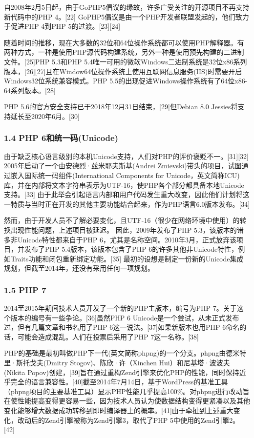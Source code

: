 自2008年2月5日起，由于GoPHP5倡议的缘故，许多广受关注的开源项目不再支持新代码中的PHP 4。[22] GoPHP5倡议是由一个PHP开发者联盟发起的，他们致力于促进PHP 4到PHP 5的过渡。[23][24]

随着时间的推移，现在大多数的32位和64位操作系统都可以使用PHP解释器。有两种方式，一种是使用PHP源代码构建系统，另外一种是使用预先构建的二进制文件。[25]PHP 5.3和PHP 5.4唯一可用的微软Windows二进制系统是32位x86系列版本，[26][27]且在Window64位操作系统上使用互联网信息服务(IIS)时需要开启Windows32位系统兼容模式。PHP 5.5的出现促进Windows操作系统有了64位x86-64系列版本。[28]

PHP 5.6的官方安全支持已于2018年12月31日结束，[29]但Debian 8.0 Jessies将支持延长至2020年6月。[30]
\subsubsection{1.4 PHP 6和统一码(Unicode)}
由于缺乏核心语言级别的本机Unicode支持，人们对PHP的评价褒贬不一。[31][32] 2005年启动了一个由安德烈·兹米耶夫斯基(Andrei Zmievski)带头的项目，试图通过嵌入国际统一码组件(International Components for Unicode，英文简称ICU)库，并在内部将文本字符串表示为UTF-16，使PHP各个部分都具备本地Unicode支持。[33] 由于此举会引起语言内部和用户代码发生重大改变，因此他们计划将这一特质与当时正在开发的其他主要功能结合起来，作为PHP语言6.0版本发布。[34]

然而，由于开发人员不了解必要变化，且UTF-16（很少在网络环境中使用）的转换出现性能问题，上述项目被延迟。 因此，2009年发布了PHP 5.3，该版本的诸多非Unicode特性都来自于PHP 6，尤其是名称空间。2010年3月，正式放弃该项目，并发布了PHP 5.4版本，该版本包含了PHP 6的许多其他非Unicode特性，例如Traits功能和闭包重新绑定功能。[35] 最初的设想是制定一份新的Unicode集成规划，但截至2014年，还没有采用任何一项规划。
\subsubsection{1.5 PHP 7}
2014至2015年期间技术人员开发了一个新的PHP主版本，编号为PHP 7。关于这个版本的编号有一些争论。[36]虽然PHP 6 Unicode是一个尝试，从未正式发布过，但有几篇文章和书名用了PHP 6这一说法。[37]如果新版本也用PHP 6命名的话，可能会造成混乱。人们在投票后采用了PHP 7这一名称。[38]

PHP的基础是最初叫做PHP下一代(英文简称phpng)的一个分支。phpng由德米特里·斯托戈夫(Dmitry Stogov)、陈欣·许（Xinchen Hui）和尼基塔·波波夫(Nikita Popov)创建，[39]旨在通过重构Zend引擎来优化PHP的性能，同时保持近乎完全的语言兼容性。[40]截至2014年7月14日，基于WordPress的基准工具（phpng项目的主要基准工具）显示PHP性能几乎提高100\%。对phpng进行改动旨在使性能提高变得更容易一些，因为技术人员认为使数据结构变得更紧凑以及其他变化能够增大数据成功转移到即时编译器上的概率。[41]由于牵扯到上述重大变化，改动后的Zend引擎被称为Zend引擎3，取代了PHP 5中使用的Zend引擎2。[42]

